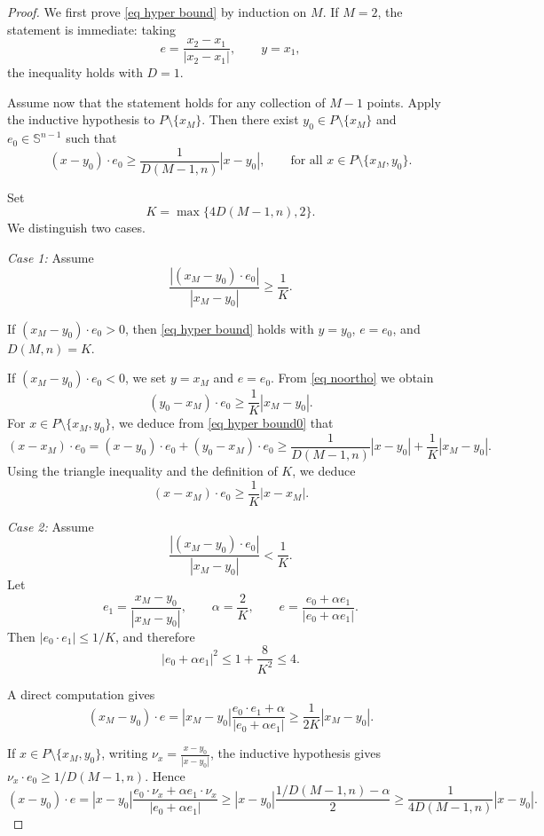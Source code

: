 \documentclass[11pt,letterpaper,reqno]{amsart}
\theoremstyle{plain}%
\theoremstyle{definition}
\numberwithin{equation}{section}
\numberwithin{figure}{section}
\begin{document}
\begin{proof}
We first prove \eqref{eq hyper bound} by induction on \(M\). If \(M=2\), the statement is immediate: taking
\[
e=\frac{x_2-x_1}{|x_2-x_1|},
\qquad
y=x_1,
\]
the inequality holds with \(D=1\).

Assume now that the statement holds for any collection of \(M-1\) points.  
Apply the inductive hypothesis to \(P\setminus\{x_M\}\). Then there exist 
\(y_0\in P\setminus\{x_M\}\) and \(e_0\in\mathbb S^{n-1}\) such that
\begin{equation}\label{eq hyper bound0}
(x-y_0)\cdot e_0
\ge
\frac{1}{D(M-1,n)}|x-y_0|,
\qquad
\text{for all } x\in P\setminus\{x_M,y_0\}.
\end{equation}

Set
\[
K=\max\{4D(M-1,n),2\}.
\]
We distinguish two cases.

\medskip
\noindent
\textit{Case 1:} Assume
\begin{equation}\label{eq noortho}
\frac{|(x_M-y_0)\cdot e_0|}{|x_M-y_0|}
\ge
\frac{1}{K}.
\end{equation}

If \((x_M-y_0)\cdot e_0>0\), then \eqref{eq hyper bound} holds with 
\(y=y_0\), \(e=e_0\), and \(D(M,n)=K\).

If \((x_M-y_0)\cdot e_0<0\), we set \(y=x_M\) and \(e=e_0\).  
From \eqref{eq noortho} we obtain
\[
(y_0-x_M)\cdot e_0
\ge
\frac{1}{K}|x_M-y_0|.
\]
For \(x\in P\setminus\{x_M,y_0\}\), we deduce from \eqref{eq hyper bound0} that
\[
(x-x_M)\cdot e_0
=
(x-y_0)\cdot e_0+(y_0-x_M)\cdot e_0
\ge
\frac{1}{D(M-1,n)}|x-y_0|
+
\frac{1}{K}|x_M-y_0|.
\]
Using the triangle inequality and the definition of \(K\), we deduce
\[
(x-x_M)\cdot e_0
\ge
\frac{1}{K}|x-x_M|.
\]

\medskip
\noindent
\textit{Case 2:} Assume
\begin{equation}\label{eq aortho}
\frac{|(x_M-y_0)\cdot e_0|}{|x_M-y_0|}
<
\frac{1}{K}.
\end{equation}
Let
\[
e_1=\frac{x_M-y_0}{|x_M-y_0|},
\qquad
\alpha=\frac{2}{K},
\qquad
e=\frac{e_0+\alpha e_1}{|e_0+\alpha e_1|}.
\]
Then \(|e_0\cdot e_1|\le 1/K\), and therefore
\begin{equation}\label{eq e1e2}
|e_0+\alpha e_1|^2
\le
1+\frac{8}{K^2}
\le 4.
\end{equation}

A direct computation gives
\[
(x_M-y_0)\cdot e
=
|x_M-y_0|
\frac{e_0\cdot e_1+\alpha}{|e_0+\alpha e_1|}
\ge
\frac{1}{2K}|x_M-y_0|.
\]

If \(x\in P\setminus\{x_M,y_0\}\), writing 
\(\nu_x=\frac{x-y_0}{|x-y_0|}\), the inductive hypothesis gives
\(\nu_x\cdot e_0\ge 1/D(M-1,n)\). Hence
\[
(x-y_0)\cdot e
=
|x-y_0|
\frac{e_0\cdot\nu_x+\alpha e_1\cdot\nu_x}{|e_0+\alpha e_1|}
\ge |x-y_0|
\frac{1/D(M-1,n)-\alpha }{2} \ge
\frac{1}{4D(M-1,n)}|x-y_0|.
\]


\end{proof}
\end{document}
